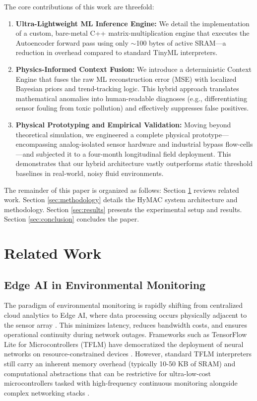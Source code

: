 \documentclass[runningheads]{llncs}
\begin{document}
The core contributions of this work are threefold:
\begin{enumerate}
    \item \textbf{Ultra-Lightweight ML Inference Engine:} We detail the implementation of a custom, bare-metal C++ matrix-multiplication engine that executes the Autoencoder forward pass using only $\sim$100 bytes of active SRAM—a reduction in overhead compared to standard TinyML interpreters.
    \item \textbf{Physics-Informed Context Fusion:} We introduce a deterministic Context Engine that fuses the raw ML reconstruction error (MSE) with localized Bayesian priors and trend-tracking logic. This hybrid approach translates mathematical anomalies into human-readable diagnoses (e.g., differentiating sensor fouling from toxic pollution) and effectively suppresses false positives.
    \item \textbf{Physical Prototyping and Empirical Validation:} Moving beyond theoretical simulation, we engineered a complete physical prototype—encompassing analog-isolated sensor hardware and industrial bypass flow-cells—and subjected it to a four-month longitudinal field deployment. This demonstrates that our hybrid architecture vastly outperforms static threshold baselines in real-world, noisy fluid environments.
\end{enumerate}

The remainder of this paper is organized as follows: Section \ref{sec:related} reviews related work. Section \ref{sec:methodology} details the HyMAC system architecture and methodology. Section \ref{sec:results} presents the experimental setup and results. Section \ref{sec:conclusion} concludes the paper.

\section{Related Work}
\label{sec:related}

\subsection{Edge AI in Environmental Monitoring}
The paradigm of environmental monitoring is rapidly shifting from centralized cloud analytics to Edge AI, where data processing occurs physically adjacent to the sensor array \cite{ref_shi,ref_gupta}. This minimizes latency, reduces bandwidth costs, and ensures operational continuity during network outages. Frameworks such as TensorFlow Lite for Microcontrollers (TFLM) have democratized the deployment of neural networks on resource-constrained devices \cite{ref_david}. However, standard TFLM interpreters still carry an inherent memory overhead (typically 10-50 KB of SRAM) and computational abstractions that can be restrictive for ultra-low-cost microcontrollers tasked with high-frequency continuous monitoring alongside complex networking stacks \cite{ref_saptarshi}.
\end{document}
